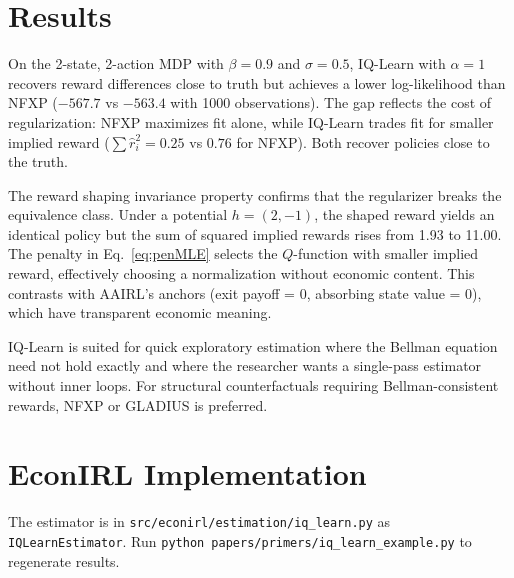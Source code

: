 \documentclass[11pt]{article}
\begin{document}
\section{Results}



On the 2-state, 2-action MDP with $\beta = 0.9$ and $\sigma = 0.5$, IQ-Learn with $\alpha = 1$ recovers reward differences close to truth but achieves a lower log-likelihood than NFXP ($-567.7$ vs $-563.4$ with 1000 observations). The gap reflects the cost of regularization: NFXP maximizes fit alone, while IQ-Learn trades fit for smaller implied reward ($\sum\hat{r}_i^2 = 0.25$ vs $0.76$ for NFXP). Both recover policies close to the truth.

The reward shaping invariance property confirms that the regularizer breaks the equivalence class. Under a potential $h = (2, -1)$, the shaped reward yields an identical policy but the sum of squared implied rewards rises from 1.93 to 11.00. The penalty in Eq.~\eqref{eq:penMLE} selects the $Q$-function with smaller implied reward, effectively choosing a normalization without economic content. This contrasts with AAIRL's anchors (exit payoff = 0, absorbing state value = 0), which have transparent economic meaning.

IQ-Learn is suited for quick exploratory estimation where the Bellman equation need not hold exactly and where the researcher wants a single-pass estimator without inner loops. For structural counterfactuals requiring Bellman-consistent rewards, NFXP or GLADIUS is preferred.


\section{EconIRL Implementation}

The estimator is in \texttt{src/econirl/estimation/iq\_learn.py} as \texttt{IQLearnEstimator}. Run \texttt{python papers/primers/iq\_learn\_example.py} to regenerate results.
\end{document}

